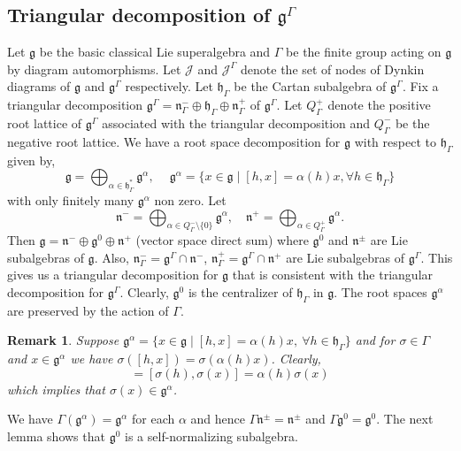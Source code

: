 \documentclass[11pt]{amsart}
\theoremstyle{plain}
\newtheorem{rem}[thm]{Remark}
\theoremstyle{definition}
\newcommand{\g}{\mathfrak{g}}
\newcommand{\h}{\mathfrak{h}}
\newcommand{\n}{\mathfrak{n}}
\begin{document}
\subsection{Triangular decomposition of $\g^{\Gamma}$}
Let $\g$ be the basic classical Lie superalgebra  and $\Gamma$ be the finite group acting on $\g$ by diagram automorphisms. Let $\mathcal{J}$ and $\mathcal{J}^{\Gamma}$ denote the set of nodes of Dynkin diagrams of $\g$ and $\g^{\Gamma}$ respectively. Let $\h_{\Gamma}$ be the Cartan subalgebra of $\g^{\Gamma}$.
Fix a triangular decomposition $\g^{\Gamma}=\n^{-}_{\Gamma}\oplus\h_{\Gamma}\oplus\n^{+}_{\Gamma}$ of $\g^{\Gamma}$. Let $Q_{\Gamma}^{+}$ denote the positive root lattice of $\g^{\Gamma}$ associated with the triangular decomposition and $Q_{\Gamma}^{-}$ be the negative root lattice. We have a root space decomposition for $\g$ with respect to $\h_{\Gamma}$ given by, 
\begin{equation}\label{eq:9}
\g=\bigoplus_{\alpha\in\h_{\Gamma}^{*}}\g^{\alpha},\quad ~\g^{\alpha}=\{x\in\g \mid [h, x]=\alpha(h)x, \forall  h\in\h_{\Gamma}\}
\end{equation}
with only finitely many $\g^{\alpha}$ non zero. Let
\begin{equation*}
    \n^{-}=\bigoplus_{\alpha\in Q_{\Gamma}^{-}\setminus\{0\}}\g^{\alpha}, \quad \n^{+}=\bigoplus_{\alpha\in Q_{\Gamma}^{+}}\g^{\alpha}.
\end{equation*}
Then $\g=\n^{-}\oplus\g^{0}\oplus\n^{+}$ (vector space direct sum) where $\g^{0}$ and $\n^{\pm}$ are Lie subalgebras of $\g$. Also, $\n_{\Gamma}^{-}=\g^{\Gamma}\cap\n^{-}$, $\n_{\Gamma}^{+}=\g^{\Gamma}\cap\n^{+}$ are Lie subalgebras of $\g^{\Gamma}$. This gives us a triangular decomposition for $\g$ that is consistent with the triangular decomposition for $\g^{\Gamma}$. Clearly, $\g^{0}$ is the centralizer of $\h_{\Gamma}$ in $\g$. The root spaces $\g^{\alpha}$ are preserved by the action of $\Gamma$.
\begin{rem}
Suppose $\g^{\alpha}=\{x\in\g\mid [h, x]=\alpha(h)x,~\forall h\in\h_{\Gamma}\}$ and for $\sigma\in\Gamma$ and $x\in\g^{\alpha}$ we have
$\sigma([h, x])=\sigma(\alpha(h)x)$.
Clearly,
\begin{equation*}
     [h,\sigma(x)] =  [\sigma(h),\sigma(x)]=\alpha(h)\sigma(x)
\end{equation*}
which implies that $\sigma(x) \in \g^{\alpha}$.    
\end{rem}
 We have  $\Gamma(\g^{\alpha})= \g^{\alpha}$ for each $\alpha$ and hence $\Gamma \n ^{\pm}=\n^{\pm}$ and $\Gamma \g^{0}=\g^{0}.$ The next lemma shows that $\g^{0}$ is a self-normalizing subalgebra.
\end{document}
